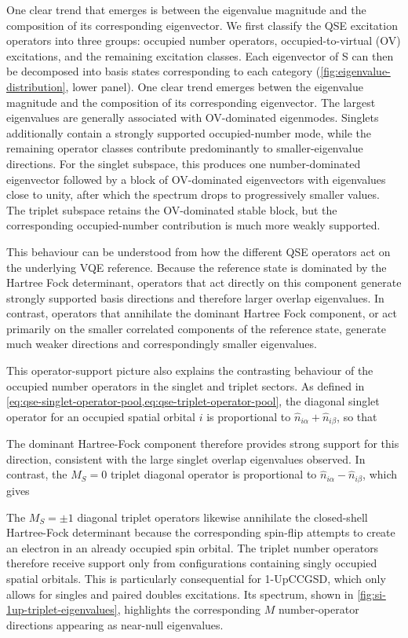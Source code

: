 One clear trend that emerges is between the eigenvalue magnitude and the composition of its corresponding eigenvector. 
We first classify the QSE excitation operators into three groups: occupied number operators, occupied-to-virtual (OV) excitations, and the remaining excitation classes. 
Each eigenvector of S can then be decomposed into basis states corresponding to each category (\cref{fig:eigenvalue-distribution}, lower panel). 
One clear trend emerges betwen the eigenvalue magnitude and the composition of its corresponding eigenvector.
The largest eigenvalues are generally associated with OV-dominated eigenmodes. Singlets additionally contain a strongly supported occupied-number mode, while the remaining operator classes contribute predominantly to smaller-eigenvalue directions. 
For the singlet subspace, this produces one number-dominated eigenvector followed by a block of OV-dominated eigenvectors with eigenvalues close to unity, after which the spectrum drops to progressively smaller values. The triplet subspace retains the OV-dominated stable block, but the corresponding occupied-number contribution is much more weakly supported.

This behaviour can be understood from how the different QSE operators act on the underlying VQE reference. 
Because the reference state is dominated by the Hartree Fock determinant, operators that act directly on this component generate strongly supported basis directions and therefore larger overlap eigenvalues. 
In contrast, operators that annihilate the dominant Hartree Fock component, or act primarily on the smaller correlated components of the reference state, generate much weaker directions and correspondingly smaller eigenvalues.

This operator-support picture also explains the contrasting behaviour of the occupied number operators in the singlet and triplet sectors. As defined in \cref{eq:qse-singlet-operator-pool,eq:qse-triplet-operator-pool}, the diagonal singlet operator for an occupied spatial orbital $i$ is proportional to $\hat n_{i\alpha}+\hat n_{i\beta}$, so that
\SingletOnHFEquation

The dominant Hartree-Fock component therefore provides strong support for this direction, consistent with the large singlet overlap eigenvalues observed. In contrast, the $M_S=0$ triplet diagonal operator is proportional to $\hat n_{i\alpha}-\hat n_{i\beta}$, which gives
\TripletOnHFEquation

The $M_S=\pm1$ diagonal triplet operators likewise annihilate the closed-shell Hartree-Fock determinant because the corresponding spin-flip attempts to create an electron in an already occupied spin orbital. 
The triplet number operators therefore receive support only from configurations containing singly occupied spatial orbitals. 
This is particularly consequential for 1-UpCCGSD, which only allows for singles and paired doubles excitations. Its spectrum, shown in \cref{fig:si-1up-triplet-eigenvalues}, highlights the corresponding $M$ number-operator directions appearing as near-null eigenvalues.

